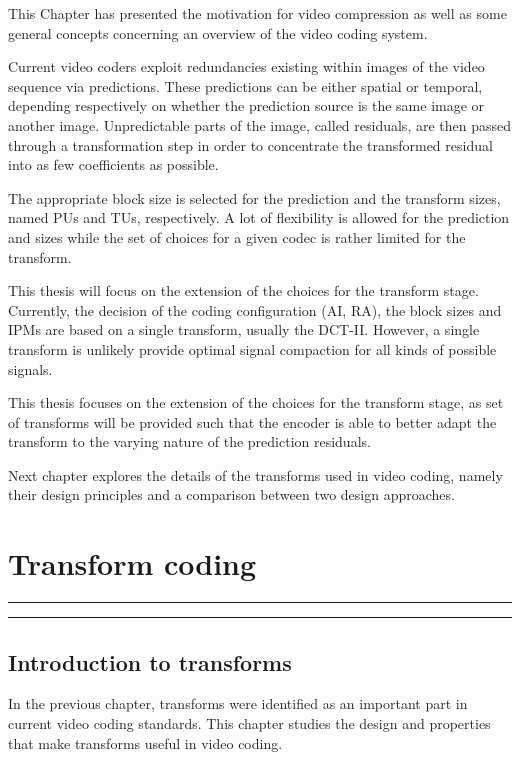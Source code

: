 \documentclass[11pt,a4paper,openright,twoside]{book}
\providecommand{\chaptertoc}{
	\startcontents[chapters]
	\hrule
	\vspace{1em}
	\printcontents[chapters]{}{1}{{\sf\large\bfseries Contents}}
	\vspace{1em}
	\hrule
}
\numberwithin{equation}{section} %
\numberwithin{figure}{section} %
\numberwithin{table}{section} %
\begin{document}
This Chapter has presented the motivation for video compression as well as
some general concepts concerning an overview of the video coding system.

Current video coders exploit redundancies existing within images of the video
sequence via predictions.
These predictions can be either spatial or temporal, depending respectively on
whether the prediction source is the same image or another image.
Unpredictable parts of the image, called residuals, are then passed through a
transformation step in order to concentrate the transformed residual into as
few coefficients as possible.

The appropriate block size is selected for the prediction and the transform
sizes, named \acp{PU} and \acp{TU}, respectively.
A lot of flexibility is allowed for the prediction and sizes while the set of
choices for a given codec is rather limited for the transform.

This thesis will focus on the extension of the choices for the transform
stage.
Currently, the decision of the coding configuration (\ac{AI}, \ac{RA}), the
block sizes and \acp{IPM} are based on a single transform, usually the
\ac{DCT}-II.
However, a single transform is unlikely provide optimal signal compaction for
all kinds of possible signals.

This thesis focuses on the extension of the choices for the transform
stage, as set of transforms will be provided such that the encoder is able to
better adapt the transform to the varying nature of the prediction residuals.

Next chapter explores the details of the transforms used in video coding,
namely their design principles and a comparison between two design approaches.

\chapter{Transform coding}
\label{cha:transform_coding}
\chaptertoc

\section{Introduction to transforms}
\label{sec:introduction_to_transforms}

In the previous chapter, transforms were identified as an important part in
current video coding standards.
This chapter studies the design and properties that make transforms useful in
video coding.
\end{document}
